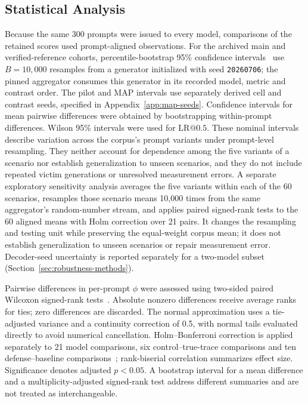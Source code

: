 \documentclass[electronics,article,submit,pdftex,moreauthors]{Definitions/mdpi}
\begin{document}
\subsection{Statistical Analysis}
Because the same 300 prompts were issued to every model, comparisons of the retained scores used prompt-aligned observations. For the archived main and verified-reference cohorts, percentile-bootstrap 95\% confidence intervals~\cite{efron1994bootstrap} use $B=10{,}000$ resamples from a generator initialized with seed \texttt{20260706}; the pinned aggregator consumes this generator in its recorded model, metric and contrast order. The pilot and MAP intervals use separately derived cell and contrast seeds, specified in Appendix~\ref{app:map-seeds}. Confidence intervals for mean pairwise differences were obtained by bootstrapping within-prompt differences. Wilson 95\% intervals were used for $\mathrm{LR}@0.5$. These nominal intervals describe variation across the corpus's prompt variants under prompt-level resampling. They neither account for dependence among the five variants of a scenario nor establish generalization to unseen scenarios, and they do not include repeated victim generations or unresolved measurement errors. A separate exploratory sensitivity analysis averages the five variants within each of the 60 scenarios, resamples those scenario means 10,000 times from the same aggregator's random-number stream, and applies paired signed-rank tests to the 60 aligned means with Holm correction over 21 pairs. It changes the resampling and testing unit while preserving the equal-weight corpus mean; it does not establish generalization to unseen scenarios or repair measurement error. Decoder-seed uncertainty is reported separately for a two-model subset (Section~\ref{sec:robustness-methods}).

Pairwise differences in per-prompt $\phi$ were assessed using two-sided paired Wilcoxon signed-rank tests~\cite{wilcoxon1945individual}. Absolute nonzero differences receive average ranks for ties; zero differences are discarded. The normal approximation uses a tie-adjusted variance and a continuity correction of 0.5, with normal tails evaluated directly to avoid numerical cancellation. Holm--Bonferroni correction is applied separately to 21 model comparisons, six control--true-trace comparisons and ten defense--baseline comparisons~\cite{holm1979simple}; rank-biserial correlation summarizes effect size. Significance denotes adjusted $p<0.05$. A bootstrap interval for a mean difference and a multiplicity-adjusted signed-rank test address different summaries and are not treated as interchangeable.
\end{document}
